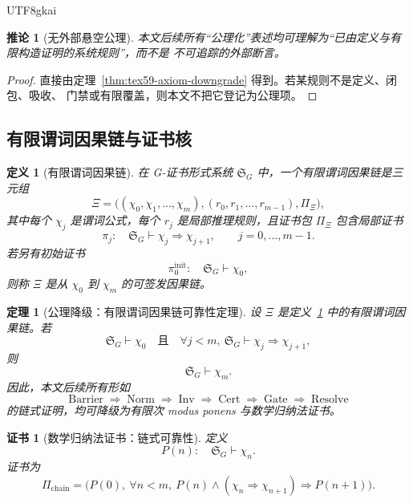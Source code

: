 \documentclass[12pt]{article}
\newtheorem{definition}{定义}[section]
\newtheorem{theorem}{定理}[section]
\newtheorem{corollary}{推论}[section]
\newtheorem{Certificate}{证书}[section]
\DeclareMathOperator{\Cert}{Cert}
\DeclareMathOperator{\Resolve}{Resolve}
\DeclareMathOperator{\Barrier}{Barrier}
\DeclareMathOperator{\Norm}{Norm}
\DeclareMathOperator{\Gate}{Gate}
\DeclareMathOperator{\Inv}{Inv}
\begin{document}
\begin{CJK*}{UTF8}{gkai}
\begin{corollary}[无外部悬空公理]
\label{cor:tex59-no-floating-axiom}
本文后续所有“公理化”表述均可理解为“已由定义与有限构造证明的系统规则”，而不是
不可追踪的外部断言。
\end{corollary}

\begin{proof}
直接由定理~\ref{thm:tex59-axiom-downgrade} 得到。若某规则不是定义、闭包、吸收、
门禁或有限覆盖，则本文不把它登记为公理项。
\end{proof}

\subsection{有限谓词因果链与证书核}
\label{subsec:tex59-causal-chain-kernel}

\begin{definition}[有限谓词因果链]
\label{def:tex59-causal-chain}
在 G-证书形式系统 \(\mathfrak S_G\) 中，一个有限谓词因果链是三元组
\[
  \Xi
  =
  \bigl(
    (\chi_0,\chi_1,\ldots,\chi_m),
    (r_0,r_1,\ldots,r_{m-1}),
    \Pi_{\Xi}
  \bigr),
\]
其中每个 \(\chi_j\) 是谓词公式，每个 \(r_j\) 是局部推理规则，且证书包
\(\Pi_{\Xi}\) 包含局部证书
\[
  \pi_j:\quad
  \mathfrak S_G\vdash \chi_j\Rightarrow\chi_{j+1},
  \qquad j=0,\ldots,m-1.
\]
若另有初始证书
\[
  \pi_0^{\mathrm{init}}:\quad
  \mathfrak S_G\vdash\chi_0,
\]
则称 \(\Xi\) 是从 \(\chi_0\) 到 \(\chi_m\) 的可签发因果链。
\end{definition}

\begin{theorem}[公理降级：有限谓词因果链可靠性定理]
\label{thm:tex59-causal-chain-soundness}
设 \(\Xi\) 是定义~\ref{def:tex59-causal-chain} 中的有限谓词因果链。若
\[
  \mathfrak S_G\vdash\chi_0
  \quad\text{且}\quad
  \forall j<m,\ \mathfrak S_G\vdash \chi_j\Rightarrow\chi_{j+1},
\]
则
\[
  \mathfrak S_G\vdash\chi_m.
\]
因此，本文后续所有形如
\[
  \Barrier
  \Longrightarrow
  \Norm
  \Longrightarrow
  \Inv
  \Longrightarrow
  \Cert
  \Longrightarrow
  \Gate
  \Longrightarrow
  \Resolve
\]
的链式证明，均可降级为有限次 modus ponens 与数学归纳法证书。
\end{theorem}

\begin{Certificate}[数学归纳法证书：链式可靠性]
\label{cert:tex59-causal-chain-soundness}
定义
\[
  P(n):\quad \mathfrak S_G\vdash\chi_n.
\]
证书为
\[
  \Pi_{\mathrm{chain}}
  =
  \bigl(
    P(0),\
    \forall n<m,\ P(n)\wedge(\chi_n\Rightarrow\chi_{n+1})\Rightarrow P(n+1)
  \bigr).
\]
\end{Certificate}


\end{CJK*}
\end{document}
